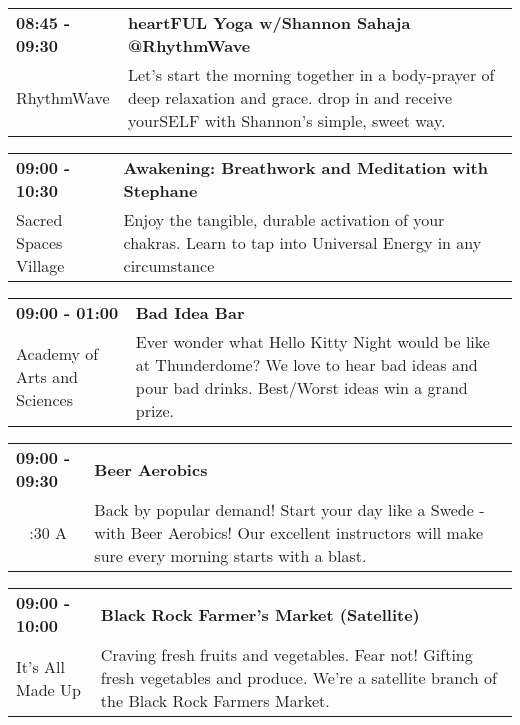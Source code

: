 \begin{tabular}{ p{1in} p{2.2in} }
    \textbf{08:45 - 09:30} & \textbf{heartFUL Yoga w/Shannon Sahaja @RhythmWave} \\
    RhythmWave \newline  & Let's start the morning together in a body-prayer of deep relaxation and grace. drop in and receive yourSELF with Shannon's simple, sweet way. \\
    \hline 
\end{tabular}
    
\begin{tabular}{ p{1in} p{2.2in} }
    \textbf{09:00 - 10:30} & \textbf{Awakening: Breathwork and Meditation with Stephane} \\
    Sacred Spaces Village \newline  & Enjoy the tangible, durable activation of your chakras. Learn to tap into Universal Energy in any circumstance \\
    \hline 
\end{tabular}
    
\begin{tabular}{ p{1in} p{2.2in} }
    \textbf{09:00 - 01:00} & \textbf{Bad Idea Bar} \\
    Academy of Arts and Sciences \newline  & Ever wonder what Hello Kitty Night would be like at Thunderdome? We love to hear bad ideas and pour bad drinks. Best/Worst ideas win a grand prize. \\
    \hline 
\end{tabular}
    
\begin{tabular}{ p{1in} p{2.2in} }
    \textbf{09:00 - 09:30} & \textbf{Beer Aerobics} \\
    ~ \newline 4:30 A & Back by popular demand! Start your day like a Swede - with Beer Aerobics! Our excellent instructors will make sure every morning starts with a blast. \\
    \hline 
\end{tabular}
    
\begin{tabular}{ p{1in} p{2.2in} }
    \textbf{09:00 - 10:00} & \textbf{Black Rock Farmer's Market (Satellite)} \\
    It's All Made Up \newline  & Craving fresh fruits and vegetables. Fear not! Gifting fresh vegetables and produce. We're a satellite branch of the Black Rock Farmers Market. \\
    \hline 
\end{tabular}
    
